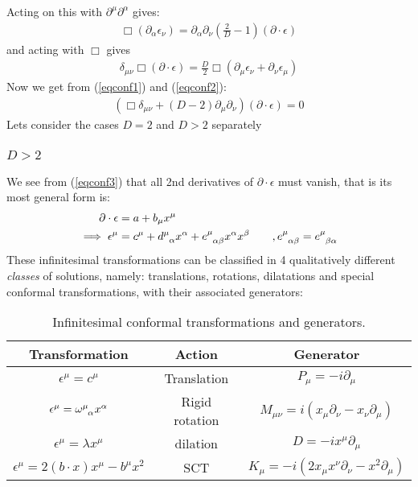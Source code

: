   Acting on this with $\partial^\mu \partial^\alpha$ gives:
  \begin{align}
   \Box( \partial_\alpha \epsilon_\nu) = \partial_\alpha \partial_\nu \left( \frac{2}{D}-1\right) (\partial \cdot \epsilon) \label{eqconf1}
  \end{align}
  and acting with $\Box$ gives
  \begin{align}
   \delta_{\mu\nu} \Box (\partial \cdot \epsilon) = \frac{D}{2} \Box (\partial_\mu \epsilon_\nu + \partial_\nu \epsilon_\mu) \label{eqconf2}
  \end{align}
Now we get from (\ref{eqconf1}) and (\ref{eqconf2}):
\begin{align}
 \left(\Box \delta_{\mu\nu} + (D-2)\partial_\mu \partial_\nu \right)(\partial \cdot \epsilon) = 0 \label{eqconf3}
\end{align}
Lets consider the cases $D=2$ and $D > 2$ separately
\subsubsection{\underline{$D > 2$}}
We see from (\ref{eqconf3}) that all 2nd derivatives of $\partial \cdot \epsilon$ must vanish, that is its most general form is:
\begin{align}
 \partial \cdot \epsilon &= a + b_\mu  x^\mu \\
 \implies \epsilon^\mu &= c^\mu + \tensor[]{d}{^\mu_\alpha} x^\alpha + \tensor[]{e}{^\mu_{\alpha\beta}} x^\alpha x^\beta \qquad , \tensor[]{e}{^\mu_{\alpha\beta}}=\tensor[]{e}{^\mu_{\beta\alpha}}
\end{align}
These infinitesimal transformations can be classified in 4 qualitatively different \emph{classes} of solutions, namely: translations, rotations, dilatations and special conformal transformations, with their associated generators: 

\begin{table}[h!]
  \centering
  \caption{Infinitesimal conformal transformations and generators.}
  \label{ch2:table1}
  \begin{tabular}{ccc}
    \toprule
    Transformation & Action & Generator\\
    \midrule
    $\epsilon^\mu = c^\mu $ & Translation & $P_\mu = -i \partial_\mu$\\
    $\epsilon^\mu =  \tensor[]{\omega}{^\mu_\alpha} x^\alpha$ & Rigid rotation & $ M_{\mu\nu}=i(x_\mu\partial_\nu - x_\nu \partial_\mu)$ \\
    $\epsilon^\mu = \lambda x^\mu$ & dilation & $D=-i x^\mu \partial_\mu$\\
    $\epsilon^\mu = 2(b\cdot x) x^\mu - b^\mu x^2$ & SCT & $K_\mu=-i(2x_\mu x^\nu \partial_\nu-x^2 \partial_\mu)$
  \end{tabular}
\end{table}

